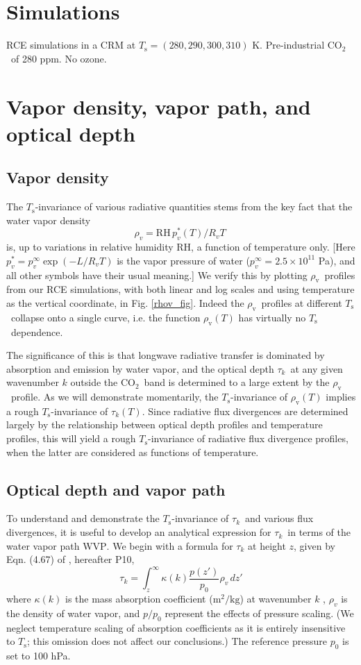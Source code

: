 \documentclass[10pt]{article}
\newcommand{\beqn}{\begin{equation}}
\newcommand{\eeqn}{\end{equation}}
\newcommand{\cotwo}{\ensuremath{\mathrm{CO_2}}}
\newcommand{\pierre}{P10}
\newcommand{\tauk}{\ensuremath{\tau_k}}
\newcommand{\rhov}{\ensuremath{\rho_\mathrm{v}}}
\newcommand{\Ts}{\ensuremath{T_\mathrm{s}}}
\newcommand{\RH}{\ensuremath{\mathrm{RH}}}
\newcommand{\WVP}{\ensuremath{\mathrm{WVP}}}
\begin{document}
\section{Simulations}
RCE simulations in a CRM at $\Ts=(280,290,300,310)$ K. Pre-industrial \cotwo\ of 280 ppm. No ozone.


\section{Vapor density, vapor path, and optical depth}
	\subsection{Vapor density}
	The \Ts-invariance of various radiative quantities stems from the key fact that  the water vapor density 
	\beqn
		\rho_v =  \RH\, p_v^*(T)/R_ vT \; 
	\label{rhov}
	\eeqn
	 is, up to variations in relative humidity \RH, a function of temperature only. [Here $p_v^* = p_v^\infty \exp(-L/R_vT)$ is the vapor pressure of water ($p_v^\infty = 2.5\times 10^{11} $ Pa), and all other symbols have their usual meaning.] We verify this by plotting \rhov\ profiles from our RCE simulations, with both linear and log scales and using temperature as the vertical coordinate,  in Fig. \ref{rhov_fig}. Indeed the \rhov\ profiles at different \Ts\ collapse onto a single curve, i.e. the function $\rhov(T)$ has virtually no \Ts\ dependence.
	 
	The significance of this is that longwave radiative transfer is dominated by absorption and emission by water vapor, and the optical depth \tauk\ at any given wavenumber $k$ outside the \cotwo\ band is determined to a large extent by the \rhov\ profile. As we will demonstrate momentarily, the \Ts-invariance of $\rhov(T)$ implies a rough \Ts-invariance of $\tauk(T)$. Since radiative flux divergences are determined largely by the relationship between optical depth profiles and temperature profiles, this will yield a rough \Ts-invariance of radiative flux divergence profiles, when the latter are considered as functions of temperature.	 

	\subsection{Optical depth and vapor path}
	To understand and demonstrate the \Ts-invariance of \tauk\ and various flux divergences,  it is useful to develop an analytical expression for \tauk\ in terms of the water vapor path \WVP. We begin with a  formula for $\tau_k$ at height $z$,  given by  Eqn. (4.67) of \cite{pierrehumbert2010}, hereafter \pierre,
	\beqn
		\tau_k = \int_z^\infty \kappa(k) \frac{p(z')}{p_0} \rho_v\, dz'  
		\label{tau1}
	\eeqn
where $\kappa(k)$ is the mass absorption coefficient ($\mathrm{m^2/kg}$) at wavenumber $k$ , $\rho_v$ is the density of water vapor, and $p/p_0$  represent the effects of pressure scaling. (We neglect temperature scaling of absorption coefficients as it is entirely insensitive to \Ts; this omission does not affect our conclusions.)  The reference pressure  $p_0$ is set to 100 hPa.
\end{document}

